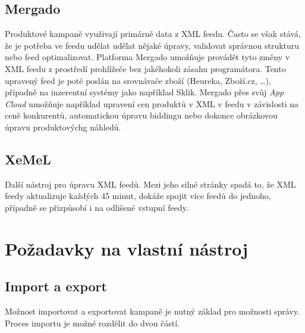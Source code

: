 \subsection{Mergado}
Produktové kampaně využivají primárně data z XML feedu. Často se však stává, že je potřeba ve feedu udělat udělat nějaké úpravy, validovat správnou strukturu nebo feed
optimalizovat. Platforma Mergado umožňuje provádět tyto změny v XML feedu z prostředí prohlížeče bez jakéhokoli zásahu programátora. Tento upravený feed je poté
poslán na srovnávače zboží (Heureka, Zboží.cz, \ldots), případně na inzerentní systémy jako například Sklik. Mergado přes svůj \emph{App Cloud} umožňuje například
upravení cen produktů v XML v feedu v závislosti na ceně konkurentů, automatickou úpravu biddingu nebo dokonce obrázkovou úpravu produktovýchg náhledů.

\subsection{XeMeL}
Další nástroj pro úpravu XML feedů. Mezi jeho silné stránky spadá to, že XML feedy aktualizuje každých 45 minut, dokáže spojit více feedů do jednoho, případně
se přizpůsobí i na odlišené vstupní feedy.

\section{Požadavky na vlastní nástroj}


\subsection{Import a export}
Možnost importovat a exportovat kampaně je nutný základ pro možnosti správy. Proces importu je možné rozdělit do dvou částí.


